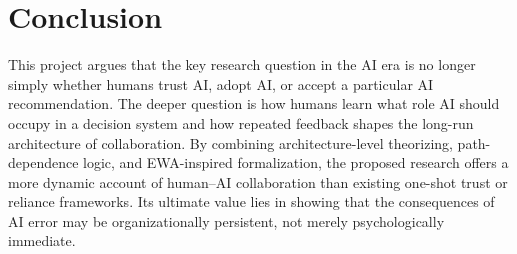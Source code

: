 \section{Conclusion}

This project argues that the key research question in the AI era is no longer simply whether humans trust AI, adopt AI, or accept a particular AI recommendation. The deeper question is how humans learn what role AI should occupy in a decision system and how repeated feedback shapes the long-run architecture of collaboration. By combining architecture-level theorizing, path-dependence logic, and EWA-inspired formalization, the proposed research offers a more dynamic account of human--AI collaboration than existing one-shot trust or reliance frameworks. Its ultimate value lies in showing that the consequences of AI error may be organizationally persistent, not merely psychologically immediate.
